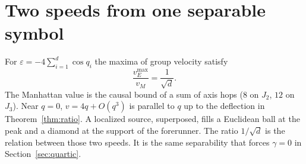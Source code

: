 \section{Two speeds from one separable symbol}
\label{sec:h-radial}

For \(\varepsilon=-4\sum_{i=1}^d\cos q_i\) the maxima of group velocity satisfy
\[
\frac{v_E^{\max}}{v_M}=\frac{1}{\sqrt{d}}.
\]
The Manhattan value is the causal bound of a sum of axis hops
(\(8\) on \(J_2\), \(12\) on \(J_3\)).
Near \(q=0\), \(v=4q+O(q^3)\) is parallel to \(q\) up to the deflection in
Theorem~\ref{thm:ratio}.
A localized source, superposed, fills a Euclidean ball at the peak and a
diamond at the support of the forerunner.
The ratio \(1/\sqrt{d}\) is the relation between those two speeds.
It is the same separability that forces \(\gamma=0\) in Section~\ref{sec:quartic}.
